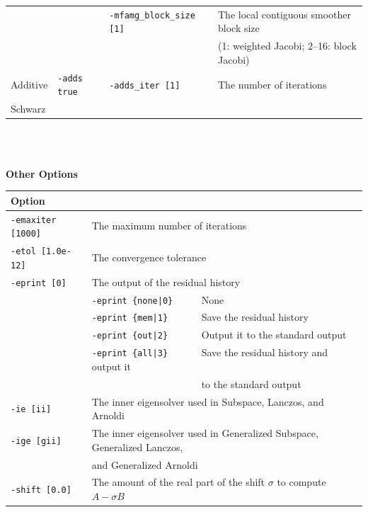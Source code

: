 \documentclass[a4paper]{article}
\begin{document}
\begin{minipage}[t]{\textwidth}
\begin{center}
\begin{tabular}{l|lll}
         &                       & \verb=-mfamg_block_size [1]= & The local contiguous smoother block size \\
         &                       &                              & (1: weighted Jacobi; 2--16: block Jacobi) \\
Additive & \verb=-adds true=     & \verb=-adds_iter [1]=       & The number of iterations   \\
Schwarz  &                       &                             &                            \\
\hline         
\end{tabular}
\end{center}
\end{minipage}
\\ \\
\begin{minipage}[t]{\textwidth}
\begin{center}
{\bf Other Options}\\
\begin{tabular}{l|ll}\hline\hline
Option &                          \\ \hline
\verb=-emaxiter [1000]= & The maximum number of iterations         \\ 
\verb=-etol [1.0e-12]=  & The convergence tolerance          \\
\verb=-eprint [0]=      & The output of the residual history                \\
                       & \verb=-eprint {none|0}     =  None \\
                       & \verb=-eprint {mem|1}      =  Save the residual history\\
                       & \verb=-eprint {out|2}      =  Output it to the standard output\\
                       & \verb=-eprint {all|3}      =  Save the residual history and output it \\
                       & \verb=                     =  to the standard output\\
\verb=-ie [ii]= & The inner eigensolver used in Subspace, Lanczos, and Arnoldi\\
\verb=-ige [gii]= & The inner eigensolver used in Generalized Subspace, Generalized Lanczos, \\
                       & and Generalized Arnoldi\\
\verb=-shift [0.0]= & The amount of the real part of the shift $\sigma$ to compute $A-\sigma B$ \\

\end{tabular}
\end{center}
\end{minipage}
\end{document}
